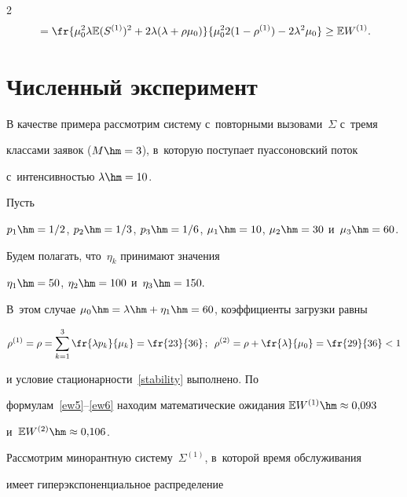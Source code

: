 \begin{multicols}{2}
\begin{multline*}
{}=


\fr{\mu_0^2 \lambda \mathbb{E} ( S^{(1)})^2 + 2 \lambda (\lambda +\rho \mu_0)} {\mu_0^2 2(1-\rho^{(1)}) - 2\lambda^2 \mu_0 } 


\ge \mathbb{E}  W^{(1)}.


\end{multline*}








\section{Численный эксперимент}





В качестве примера рассмотрим систему с~повторными вызовами~$\Sigma$ с~тремя 


классами заявок ($M\hm=3$), в~которую поступает пуассоновский поток 


с~ин\-тен\-сив\-ностью $\lambda\hm=10$.


Пусть


$p_1\hm=1/2$, $p_2\hm=1/3$, $p_3\hm=1/6$, $\mu_1\hm=10$, $\mu_2\hm=30$ и~$\mu_3\hm=60$.


Будем полагать, что~$\eta_k$ принимают значения


$\eta_1\hm=50$, $\eta_2\hm=100$ и~$\eta_3\hm=150.$


В~этом случае $\mu_0\hm=\lambda\hm+\eta_1\hm=60$,  коэффициенты загрузки \mbox{равны}


$$


\rho^{(1)}=\rho= \sum\limits_{k=1}^3 \fr{\lambda p_k}{\mu_k} = \fr{23}{36}\,; \enskip  


\rho^{(2)} = \rho+\fr{\lambda}{\mu_0} = \fr{29}{36} < 1


$$


и условие стационарности~\eqref{stability} выполнено. По 


формулам~\eqref{ew5}--\eqref{ew6} находим математические ожидания $\mathbb{E} W^{(1)} \hm\approx 0{,}093$ 


и~$\mathbb{E} W^{(2)} \hm\approx 0{,}106$.





Рассмотрим минорантную сис\-те\-му~$\Sigma^{(1)}$, в~которой время обслуживания 


имеет гиперэкспоненциальное распределение


$$



\end{multicols}
